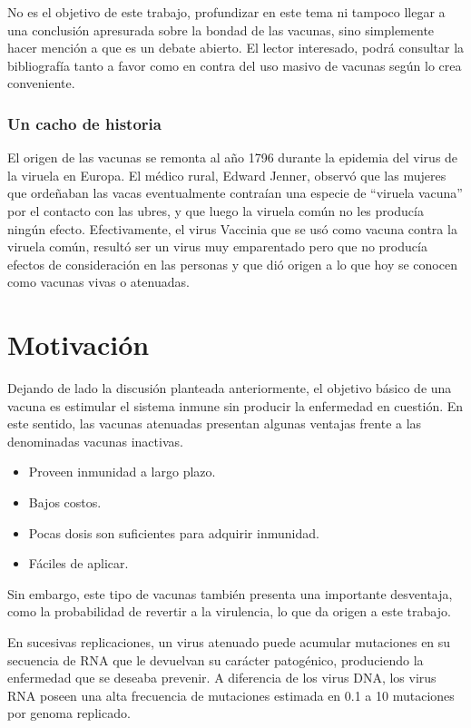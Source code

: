 No es el objetivo de este trabajo, profundizar en este tema ni tampoco llegar
a una conclusi\'on apresurada sobre la bondad de las vacunas, sino simplemente
hacer menci\'on a que es un debate abierto. El lector interesado, podr\'a
consultar la bibliograf\'ia tanto a favor como en contra del uso
masivo de vacunas seg\'un lo crea conveniente.

\subsubsection{Un cacho de historia}

El origen de las vacunas se remonta al a\~no 1796 durante la epidemia del virus
de la viruela en Europa. El m\'edico rural, Edward Jenner, observ\'o que las
mujeres que orde\~naban las vacas eventualmente contra\'ian una especie de
``viruela vacuna'' por el contacto con las ubres, y que luego la viruela com\'un
no les produc\'ia ning\'un efecto. Efectivamente, el virus Vaccinia que se us\'o
como vacuna contra la viruela com\'un, result\'o ser un virus muy emparentado
pero que no produc\'ia efectos de consideraci\'on en las personas y que di\'o
origen a lo que hoy se conocen como vacunas vivas o atenuadas.

\section{Motivaci\'on}
\label{motivacion}
Dejando de lado la discusi\'on planteada anteriormente, el objetivo b\'asico de
una vacuna es estimular el sistema inmune sin producir la enfermedad en
cuesti\'on. En este sentido, las vacunas atenuadas presentan algunas ventajas
frente a las denominadas vacunas inactivas.
\begin{itemize}
 \item Proveen inmunidad a largo plazo.
 \item Bajos costos.
 \item Pocas dosis son suficientes para adquirir inmunidad. 
 \item F\'aciles de aplicar.
\end{itemize}

Sin embargo, este tipo de vacunas tambi\'en presenta una importante desventaja,
como la probabilidad de revertir a la virulencia, lo que da origen a este
trabajo.

En sucesivas replicaciones, un virus atenuado puede acumular mutaciones en su
secuencia de \ac{RNA} que le devuelvan su car\'acter patog\'enico, produciendo
la enfermedad que se deseaba prevenir. A diferencia de los virus \ac{DNA}, los
virus \ac{RNA} poseen una alta frecuencia de mutaciones estimada en 0.1 a 10
mutaciones por genoma replicado\cite{Vignuzzi08}.

